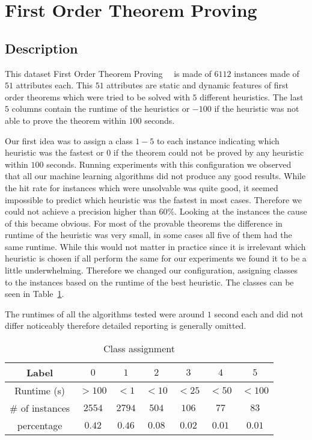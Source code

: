 \section{First Order Theorem Proving}
\label{db:sec:ds2}
\subsection{Description}
This dataset First Order Theorem Proving~\cite{ds2:uci}~\cite{ds2:paper} is made of $6112$ instances made of $51$ attributes each. This $51$ attributes are static and dynamic features of first order theorems which were tried to be solved with $5$ different heuristics. The last $5$ columns contain the runtime of the heuristics or $-100$ if the heuristic was not able to prove the theorem within $100$ seconds.\par
Our first idea was to assign a class $1-5$ to each instance indicating which heuristic was the fastest or $0$ if the theorem could not be proved by any heuristic within $100$ seconds. Running experiments with this configuration we observed that all our machine learning algorithms did not produce any good results. While the hit rate for instances which were unsolvable was quite good, it seemed impossible to predict which heuristic was the fastest in most cases. Therefore we could not achieve a precision higher than $60\%$.
Looking at the instances the cause of this became obvious. For most of the provable theorems the difference in runtime of the heuristic was very small, in some cases all five of them had the same runtime. While this would not matter in practice since it is irrelevant which heuristic is chosen if all perform the same for our experiments we found it to be a little underwhelming. Therefore we changed our configuration, assigning classes to the instances based on the runtime of the best heuristic. The classes can be seen in Table~\ref{ds2:table:classes}.
\par The runtimes of all the algorithms tested were around $1$ second each and did not differ noticeably therefore detailed reporting is generally omitted.
\begin{table}[h]
	\begin{center}
	\begin{tabular}{|c|c|c|c|c|c|c|} 
		\hline
		Label & $0$ & $1$ & $2$ & $3$ & $4$ & $5$\\\hline
		Runtime (s) & $>100$ & $<1$ & $<10$ & $<25$ & $<50$ &$<100$\\\hline
		$\#$ of instances & $2554$ & $2794$ & $504$ & $106$ & $77$ & $83$\\\hline
		percentage & $0.42$ & $0.46$ & $0.08$ & $0.02$ & $0.01$ & $0.01$\\\hline

	\end{tabular}
\end{center}
	\caption{Class assignment \label{ds2:table:classes}}
\end{table}
